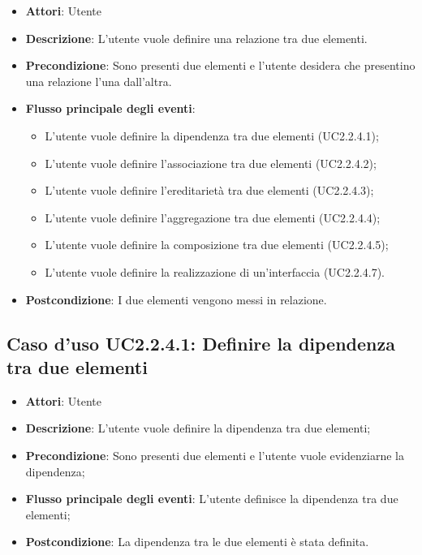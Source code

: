 \documentclass[../AnalisiDeiRequisiti.tex]{subfiles}
\begin{document}
	\begin{itemize}
		\item \textbf{Attori}: Utente
		\item \textbf{Descrizione}: L'utente vuole definire una relazione tra due elementi.
		\item \textbf{Precondizione}: Sono presenti due elementi e l'utente desidera che presentino una relazione l'una dall'altra.
		\item \textbf{Flusso principale degli eventi}: \begin{itemize}
			\item L'utente vuole definire la dipendenza tra due elementi (UC2.2.4.1);
			\item L'utente vuole definire l'associazione tra due elementi (UC2.2.4.2);
			\item L'utente vuole definire l'ereditarietà tra due elementi (UC2.2.4.3);
			\item L'utente vuole definire l'aggregazione tra due elementi (UC2.2.4.4);
			\item L'utente vuole definire la composizione tra due elementi (UC2.2.4.5);
			\item L'utente vuole definire la realizzazione di un'interfaccia (UC2.2.4.7).
			\end{itemize}
				\item \textbf{Postcondizione}: I due elementi vengono messi in relazione.
			\end{itemize}
			\subsection{Caso d'uso UC2.2.4.1: Definire la dipendenza tra due elementi}
			\begin{itemize}
				\item \textbf{Attori}: Utente
				\item \textbf{Descrizione}: L'utente vuole definire la dipendenza tra due elementi;
				\item \textbf{Precondizione}: Sono presenti due elementi e l'utente vuole evidenziarne la dipendenza;
				\item \textbf{Flusso principale degli eventi}: L'utente definisce la dipendenza tra due elementi;
				\item \textbf{Postcondizione}: La dipendenza tra le due elementi è stata definita.
			\end{itemize}
\end{document}

